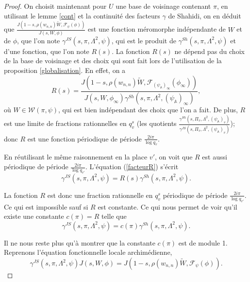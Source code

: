 \documentclass{amsart}
\begin{document}
\begin{proof}
 On choisit maintenant pour $U$ une base de voisinage contenant $\pi$, en utilisant le lemme \ref{cont} et la continuité des facteurs $\gamma$ de Shahidi, on en déduit que $\frac{J(1-s, \rho(w_{n,n})\tilde{W}, \mathcal{F}_\psi(\phi))}{J(s, W, \phi)}$
 est une fonction méromorphe indépendante de $W$ et de $\phi$, que l'on note $\gamma^{JS}(s, \pi, \Lambda^2, \psi)$, qui est le produit de $\gamma^{Sh}(s, \pi, \Lambda^2, \psi)$ et d'une fonction, que l'on note $R(s)$. La fonction $R(s)$ ne dépend pas du choix de la base de voisinage et des choix qui sont fait lors de l'utilisation de la proposition \ref{globalisation}. En effet, on a
 \begin{equation}
 \label{facteurR}
 R(s) = \frac{J(1-s, \rho(w_{n,n})\tilde{W}, \mathcal{F}_{(\psi_\mathbb{A})_\infty}(\phi_\infty))}{J(s, W, \phi_\infty)\gamma^{Sh}(s, \pi, \Lambda^2, (\psi_\mathbb{A})_\infty)},
 \end{equation}
 où $W \in \mathcal{W}(\pi, \psi)$, qui est bien indépendant des choix que l'on a fait.
 De plus, $R$ est une limite de fractions rationnelles en $q_v^s$ (les quotients $\frac{\gamma^{Sh}(s, \Pi_v, \Lambda^2, (\psi_\mathbb{A})_v)}{\gamma^{JS}(s, \Pi_v, \Lambda^2, (\psi_\mathbb{A})_v)}$); donc $R$ est une fonction périodique de période $\frac{2i\pi}{\log q_v}$.
 
  En réutilisant le même raisonnement en la place $v'$, on voit que $R$ est aussi périodique de période $\frac{2i\pi}{\log q_{v'}}$. L'équation (\ref{facteurR}) s'écrit
   \begin{equation}
 \gamma^{JS}(s, \pi, \Lambda^2, \psi) = R(s)\gamma^{Sh}(s, \pi, \Lambda^2, \psi).
 \end{equation}
 
  La fonction $R$ est donc une fraction rationnelle en $q_v^s$ périodique de période $\frac{2i\pi}{\log q_{v'}}$. Ce qui est impossible sauf si $R$ est constante. Ce qui nous permet de voir qu'il existe une constante $c(\pi)=R$ telle que
 \begin{equation}
 \gamma^{JS}(s, \pi, \Lambda^2, \psi) = c(\pi)\gamma^{Sh}(s, \pi, \Lambda^2, \psi).
 \end{equation}
 
 Il ne nous reste plus qu'à montrer que la constante $c(\pi)$ est de module 1. Reprenons l'équation fonctionnelle locale archimédienne,
 \begin{equation}
 \label{funcarch}
 \gamma^{JS}(s, \pi, \Lambda^2, \psi) J(s, W, \phi) = J(1-s, \rho(w_{n,n})\tilde{W}, \mathcal{F}_\psi(\phi)).
 \end{equation}
 

\end{proof}
\end{document}
